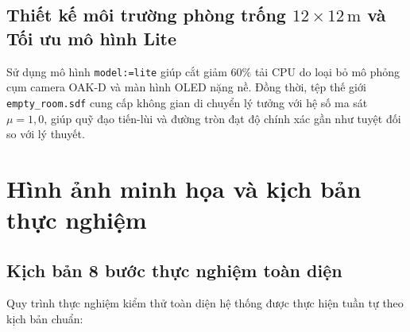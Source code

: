 \subsection{Thiết kế môi trường phòng trống $12\times 12\,\text{m}$ và Tối ưu mô hình Lite}
Sử dụng mô hình \texttt{model:=lite} giúp cắt giảm $60\%$ tải CPU do loại bỏ mô phỏng cụm camera OAK-D và màn hình OLED nặng nề. Đồng thời, tệp thế giới \texttt{empty\_room.sdf} cung cấp không gian di chuyển lý tưởng với hệ số ma sát $\mu = 1{,}0$, giúp quỹ đạo tiến-lùi và đường tròn đạt độ chính xác gần như tuyệt đối so với lý thuyết.

\section{Hình ảnh minh họa và kịch bản thực nghiệm}

\subsection{Kịch bản 8 bước thực nghiệm toàn diện}
Quy trình thực nghiệm kiểm thử toàn diện hệ thống được thực hiện tuần tự theo kịch bản chuẩn:

